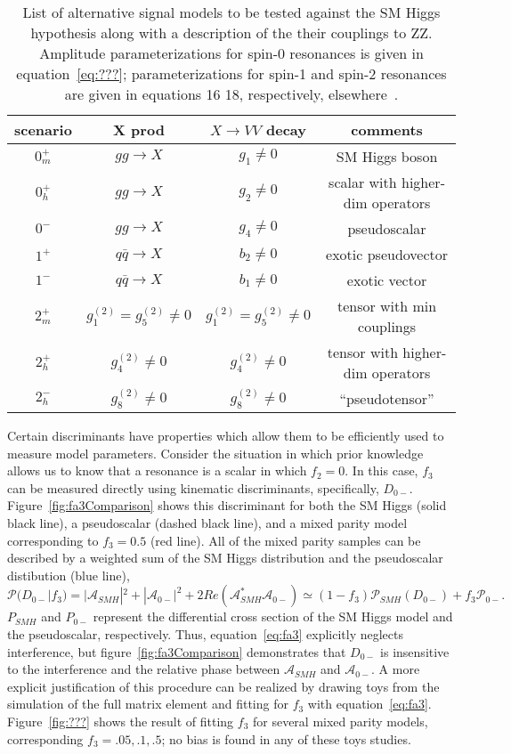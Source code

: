 \begin{table}
\begin{tabular}{cccc}
\hline 
\hline
scenario & X prod & $X\to VV$ decay & comments \\
\hline
$0_m^+$ & $gg\to X$ & $g_1\neq 0$ & SM Higgs boson \\ 
$0_h^+$ & $gg\to X$ & $g_2\neq 0$ & scalar with higher-dim operators \\ 
$0^-$ & $gg\to X$ & $g_4\neq 0$ & pseudoscalar \\ 
$1^+$ & $q\bar{q}\to X$ & $b_2\neq 0$ & exotic pseudovector\\
$1^-$ & $q\bar{q}\to X$ & $b_1\neq 0$ & exotic vector \\ 
$2_m^+$ & $g_1^{(2)}=g_5^{(2)}\neq 0$ & $g_1^{(2)}=g_5^{(2)}\neq 0$ & tensor with min couplings\\
$2_h^+$ & $g_4^{(2)}\neq 0$ & $g_4^{(2)}\neq 0$ & tensor with higher-dim operators\\
$2_h^-$ & $g_8^{(2)}\neq 0$ & $g_8^{(2)}\neq 0$ & ``pseudotensor''\\ 
\hline
\hline
\end{tabular}
\caption{List of alternative signal models to be tested against the SM Higgs 
hypothesis along with a description of the their couplings to ZZ.  Amplitude
parameterizations for spin-0 resonances is given in equation~\ref{eq:???};
parameterizations for spin-1 and spin-2 resonances are given in equations 16 
18, respectively, elsewhere~\cite{???}.}
\label{table:alternativeModels}
\end{table}


Certain discriminants have properties which allow them to be efficiently
used to measure model parameters.  Consider the situation in which prior
knowledge allows us to know that a resonance is a scalar in which $f_2=0$.
In this case, $f_3$ can be measured directly using kinematic discriminants,
specifically, $D_{0-}$.  Figure~\ref{fig:fa3Comparison} shows this discriminant for
both the SM Higgs (solid black line), a pseudoscalar (dashed black line), and a mixed parity 
model corresponding to $f_3=0.5$ (red line).  All of the mixed
parity samples can be described by a weighted sum of the SM Higgs
distribution and the 
pseudoscalar distibution (blue line), 
\begin{equation}
\mathscr{P}(D_{0-}|f_3) = |\mathscr{A}_{SMH}|^2 + |\mathscr{A}_{0-}|^2 + 2Re(\mathscr{A}_{SMH}^*\mathscr{A}_{0-}) \simeq (1-f_3)\mathscr{P}_{SMH}(D_{0-})+f_3\mathscr{P}_{0-}.
\label{eq:fa3}
\end{equation}
$P_{SMH}$ and $P_{0-}$ represent the differential cross section of the 
SM Higgs model and the pseudoscalar, respectively.
Thus, equation~\ref{eq:fa3} explicitly neglects interference, but
figure~\ref{fig:fa3Comparison} demonstrates that $D_{0-}$ is insensitive to
the interference and the relative phase between $\mathscr{A}_{SMH}$ and
$\mathscr{A}_{0-}$.  A more explicit justification of this procedure can be
realized by drawing toys from the simulation of the full matrix element and
fitting for $f_3$ with equation~\ref{eq:fa3}.  Figure~\ref{fig:???} shows
the result of fitting $f_3$ for several mixed parity models, corresponding 
$f_3=.05,.1,.5$; no bias is found in any of these toys studies.

